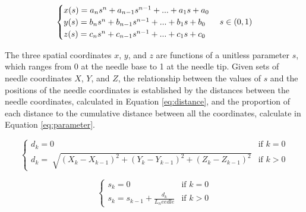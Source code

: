\begin{equation}
\label{eq:parametric_curve}
\begin{cases} x(s) = a_n s^n + a_{n-1} s^{n-1} + ... + a_1 s + a_0 \\
 y(s) = b_n s^n + b_{n-1} s^{n-1} + ... + b_1 s + b_0  \\
 z(s) = c_n s^n + c_{n-1} s^{n-1} + ... + c_1 s + c_0 \end{cases} \\
 s\in (0, 1)
 \end{equation}
 

The three spatial coordinates $x$, $y$, and $z$ are functions of a unitless parameter $s$, which ranges from 0 at the needle base to 1 at the needle tip. Given sets of needle coordinates $X$, $Y$, and $Z$, the relationship between the values of $s$ and the positions of the needle coordinates is established by the distances between the needle coordinates, calculated in Equation \ref{eq:distance}, and the proportion of each distance to the cumulative distance between all the coordinates, calculate in Equation \ref{eq:parameter}.

\begin{equation}
\label{eq:distance}
\begin{cases}
d_k = 0 &\mbox{if } k=0 \\
d_k = \sqrt[]{(X_k - X_{k-1})^2 + (Y_k - Y_{k-1})^2 + (Z_k - Z_{k-1})^2} &\mbox{if } k>0
\end{cases}
\end{equation}

\begin{equation}
\label{eq:parameter}
\begin{cases}
s_k = 0 &\mbox{if } k=0 \\
s_k = s_{k-1} + \frac{d_k}{L_needle}&\mbox{if } k>0
\end{cases}
\end{equation}

